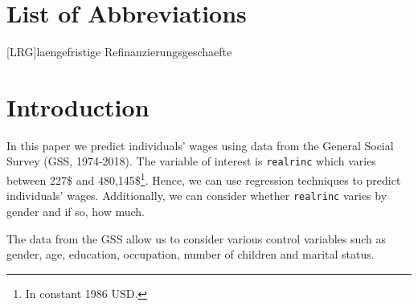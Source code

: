 \documentclass[11pt,a4paper]{article}
\let\rmarkdownfootnote\footnote%
\def\footnote{\protect\rmarkdownfootnote}
\begin{document}


{
\hypersetup{linkcolor=black}

\setcounter{tocdepth}{3}
\tableofcontents
}

\newpage
\listoffigures
{}

\listoftables
{}

\section*{List of Abbreviations}

\begin{adjustwidth}{1.5em}{0pt}

\begin{acronym}[dummyyyy]
 [LRG]{laengefristige Refinanzierungsgeschaefte}

\end{acronym}

\end{adjustwidth}

\restoregeometry

\newpage
{}
\hypertarget{introduction}{%
\section{Introduction}\label{introduction}}

In this paper we predict individuals' wages using data from the General
Social Survey (GSS, 1974-2018). The variable of interest is
\texttt{realrinc} which varies between 227\$ and
480,145\$\footnote{In constant 1986 USD.}. Hence, we can use regression
techniques to predict individuals' wages. Additionally, we can consider
whether \texttt{realrinc} varies by gender and if so, how much.

The data from the GSS allow us to consider various control variables
such as gender, age, education, occupation, number of children and
marital status.
\end{document}

